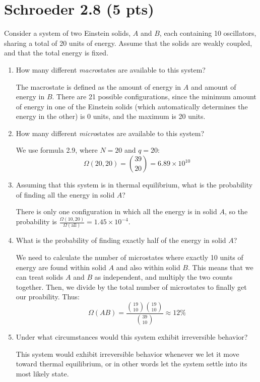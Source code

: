 \documentclass[10pt]{article}
\begin{document}
	\section*{Schroeder 2.8 (5 pts)}
	Consider a system of two Einstein solids, $A$ and $B$, each containing 10 oscillators, sharing a total 
	of 20 units of energy. Assume that the solids are weakly coupled, and that the total energy is 
	fixed. 
	\begin{enumerate}[label=\alph*)]
		\item How many different \textit{macro}states are available to this system?

			\begin{solution}
				The macrostate is defined as the amount of energy in $A$ and amount of energy in $B$. There 
				are 21 possible configurations, since the minimum amount of energy in one of the Einstein
				solids (which automatically determines the energy in the other) is 0 units, and the 
				maximum is 20 units.
			\end{solution}
		\item How many different \textit{micro}states are available to this system?

			\begin{solution}
				We use formula 2.9, where $N = 20$ and $q = 20$:
				\[
					\Omega(20, 20) = {39 \choose 20} = 6.89 \times 10^{10}	
				\] 
			\end{solution}
		\item Assuming that this system is in thermal equilibrium, what is the probability of finding all the 
			energy in solid $A$?

			\begin{solution}
				There is only one configuration in which all the energy is in solid $A$, so the probability 
				is $\frac{\Omega(10, 20)}{\Omega(\text{all})} = 1.45 \times 10^{-4}$.
			\end{solution}
		\item What is the probability of finding exactly half of the energy in solid $A$?

			\begin{solution}
				We need to calculate the number of microstates where exactly 10 units of energy are found within
				solid $A$ and also within solid $B$. This means that we can treat solids $A$ and $B$ as 
				independent, and multiply the two counts together. Then, we divide by the total 
				number of microstates to finally get our proability. Thus:
				\[
					\Omega(AB) = \frac{{19 \choose 10}{19 \choose 10}}{{39 \choose 10}} \approx 12\%
				\] 
			\end{solution}
		\item Under what circumstances would this system exhibit irreversible behavior?

			\begin{solution}
				This system would exhibit irreversible behavior whenever we let it move toward thermal 
				equilibrium, or in other words let the system settle into its most likely state. 
			\end{solution}
	\end{enumerate}
\end{document}
